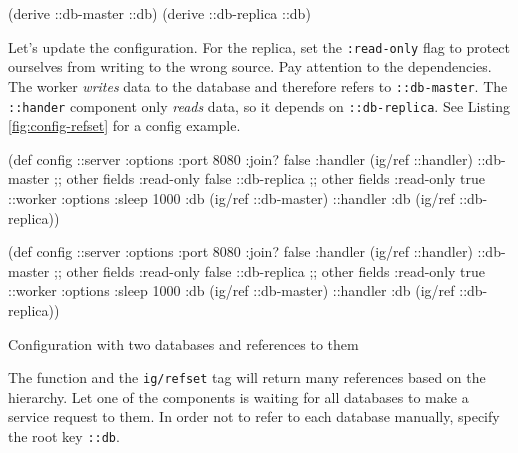 \begin{english}
  \begin{clojure}
(derive ::db-master ::db)
(derive ::db-replica ::db)
  \end{clojure}
\end{english}

Let's update the configuration. For the replica, set the \verb|:read-only| flag to protect ourselves from writing to the wrong source. Pay attention to the dependencies. The worker \emph{writes} data to the database and therefore refers to \verb|::db-master|. The \verb|::hander| component only \emph{reads} data, so it depends on \verb|::db-replica|. See Listing \ref{fig:config-refset} for a config example.

\begin{listing}[ht!]

\ifnarrow

\begin{english}
  \begin{clojure}
(def config
  {::server {:options {:port 8080
                       :join? false}
             :handler (ig/ref ::handler)}
   ::db-master {;; other fields
                :read-only false}
   ::db-replica {;; other fields
                 :read-only true}
   ::worker {:options {:sleep 1000}
             :db (ig/ref ::db-master)}
   ::handler {:db (ig/ref
                    ::db-replica)}})
  \end{clojure}
\end{english}

\else

\begin{english}
  \begin{clojure}
(def config
  {::server {:options {:port 8080 :join? false}
             :handler (ig/ref ::handler)}
   ::db-master {;; other fields
                :read-only false}
   ::db-replica {;; other fields
                 :read-only true}
   ::worker {:options {:sleep 1000}
             :db (ig/ref ::db-master)}
   ::handler {:db (ig/ref ::db-replica)}})
  \end{clojure}
\end{english}

\fi

\caption{Configuration with two databases and references to them}
\label{fig:config-refset}

\end{listing}

The function and the \verb|ig/refset| tag will return many references based on the hierarchy. Let one of the components is waiting for all databases to make a service request to them. In order not to refer to each database manually, specify the root key \verb|::db|.

